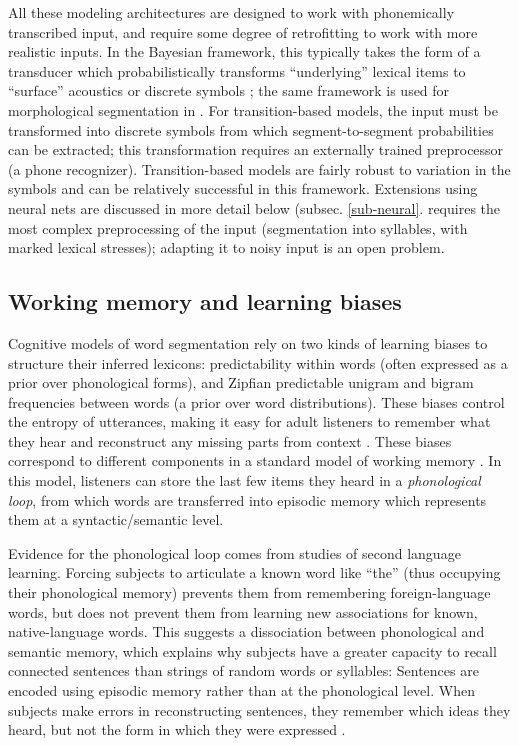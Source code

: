 \documentclass[11pt,letterpaper]{article}
\begin{document}
All these modeling architectures are designed to work with
phonemically transcribed input, and require some degree of
retrofitting to work with more realistic inputs. In the Bayesian
framework, this typically takes the form of a transducer which
probabilistically transforms ``underlying'' lexical items to
``surface'' acoustics \cite{Lee15} or discrete symbols
\cite{Elsner13}; the same framework is used for morphological
segmentation in . For transition-based models,
the input must be transformed into discrete symbols from which
segment-to-segment probabilities can be extracted; this transformation
requires an externally trained preprocessor (a phone
recognizer). Transition-based models are fairly robust to variation in
the symbols \cite{Rytting07,Rytting08,Daland10,Fleck08} and can be relatively
successful in this framework. Extensions using neural nets
\cite{Christiansen98,Rytting08} are discussed in more detail below
(subsec. \ref{sub-neural}.  requires the most
complex preprocessing of the input (segmentation into syllables, with
marked lexical stresses); adapting it to noisy input is an open
problem.

\subsection{Working memory and learning biases}

Cognitive models of word segmentation rely on two kinds of learning
biases to structure their inferred lexicons: predictability within
words (often expressed as a prior over phonological forms), and
Zipfian predictable unigram and bigram frequencies between words (a
prior over word distributions). These biases control the entropy of
utterances, making it easy for adult listeners to remember what they
hear and reconstruct any missing parts from context
\cite{Piantadosi12}. These biases correspond to different components
in a standard model of working memory \cite{Baddeley07,Baddeley74}. In
this model, listeners can store the last few items they heard in a
\textit{phonological loop}, from which words are transferred into
episodic memory which represents them at a syntactic/semantic level.

Evidence for the phonological loop comes from studies of second
language learning. Forcing subjects to articulate a known word like
``the'' (thus occupying their phonological memory) prevents them from
remembering foreign-language words, but does not prevent them from
learning new associations for known, native-language words. This
suggests a dissociation between phonological and semantic memory,
which explains why subjects have a greater capacity to recall
connected sentences than strings of random words or syllables:
Sentences are encoded using episodic memory rather than at the
phonological level. When subjects make errors in reconstructing
sentences, they remember which ideas they heard, but not the form in
which they were expressed \cite{Bransford71}.
\end{document}
